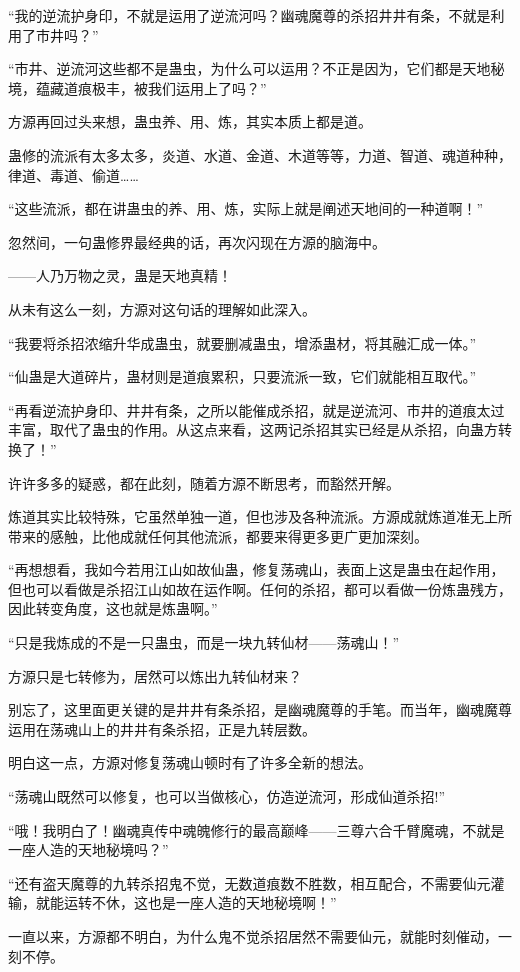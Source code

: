 \begin{this_body}
“我的逆流护身印，不就是运用了逆流河吗？幽魂魔尊的杀招井井有条，不就是利用了市井吗？”

“市井、逆流河这些都不是蛊虫，为什么可以运用？不正是因为，它们都是天地秘境，蕴藏道痕极丰，被我们运用上了吗？”

方源再回过头来想，蛊虫养、用、炼，其实本质上都是道。

蛊修的流派有太多太多，炎道、水道、金道、木道等等，力道、智道、魂道种种，律道、毒道、偷道……

“这些流派，都在讲蛊虫的养、用、炼，实际上就是阐述天地间的一种道啊！”

忽然间，一句蛊修界最经典的话，再次闪现在方源的脑海中。

——人乃万物之灵，蛊是天地真精！

从未有这么一刻，方源对这句话的理解如此深入。

“我要将杀招浓缩升华成蛊虫，就要删减蛊虫，增添蛊材，将其融汇成一体。”

“仙蛊是大道碎片，蛊材则是道痕累积，只要流派一致，它们就能相互取代。”

“再看逆流护身印、井井有条，之所以能催成杀招，就是逆流河、市井的道痕太过丰富，取代了蛊虫的作用。从这点来看，这两记杀招其实已经是从杀招，向蛊方转换了！”

许许多多的疑惑，都在此刻，随着方源不断思考，而豁然开解。

炼道其实比较特殊，它虽然单独一道，但也涉及各种流派。方源成就炼道准无上所带来的感触，比他成就任何其他流派，都要来得更多更广更加深刻。

“再想想看，我如今若用江山如故仙蛊，修复荡魂山，表面上这是蛊虫在起作用，但也可以看做是杀招江山如故在运作啊。任何的杀招，都可以看做一份炼蛊残方，因此转变角度，这也就是炼蛊啊。”

“只是我炼成的不是一只蛊虫，而是一块九转仙材——荡魂山！”

方源只是七转修为，居然可以炼出九转仙材来？

别忘了，这里面更关键的是井井有条杀招，是幽魂魔尊的手笔。而当年，幽魂魔尊运用在荡魂山上的井井有条杀招，正是九转层数。

明白这一点，方源对修复荡魂山顿时有了许多全新的想法。

“荡魂山既然可以修复，也可以当做核心，仿造逆流河，形成仙道杀招!”

“哦！我明白了！幽魂真传中魂魄修行的最高巅峰——三尊六合千臂魔魂，不就是一座人造的天地秘境吗？”

“还有盗天魔尊的九转杀招鬼不觉，无数道痕数不胜数，相互配合，不需要仙元灌输，就能运转不休，这也是一座人造的天地秘境啊！”

一直以来，方源都不明白，为什么鬼不觉杀招居然不需要仙元，就能时刻催动，一刻不停。


\end{this_body}
